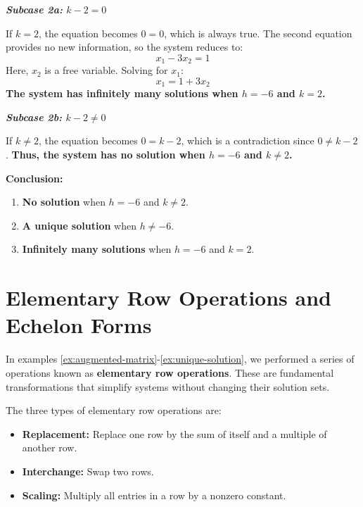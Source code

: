 \begin{example}
\begin{solution}
        \textbf{\textit{Subcase 2a:} $k - 2 = 0$}
        
          If $k = 2$, the equation becomes $0 = 0$, which is always true. The second equation provides no new information, so the system reduces to:
          \[
          x_1 - 3x_2 = 1
          \]
          Here, $x_2$ is a free variable. Solving for $x_1$:
          \[
          x_1 = 1 + 3x_2
          \]
          \textbf{The system has infinitely many solutions when $h = -6$ and $k = 2$.}
        
        \textbf{\textit{Subcase 2b:} $k - 2 \ne 0$}
        
          If $k \ne 2$, the equation becomes $0 = k - 2$, which is a contradiction since $0 \ne k - 2$. \textbf{Thus, the system has no solution when $h = -6$ and $k \ne 2$.}
                
        \textbf{Conclusion:}
        
        \begin{enumerate}[label=(\roman*)]
            \item \textbf{No solution} when $h = -6$ and $k \ne 2$.
            \item \textbf{A unique solution} when $h \ne -6$.
            \item \textbf{Infinitely many solutions} when $h = -6$ and $k = 2$.
        \end{enumerate} \end{solution}


\end{example}
\section{Elementary Row Operations and Echelon Forms}

In examples \ref{ex:augmented-matrix}-\ref{ex:unique-solution}, we performed a series of operations known as \textbf{elementary row operations}. These are fundamental transformations that simplify systems without changing their solution sets.

The three types of elementary row operations are:
\begin{itemize}
    \item \textbf{Replacement:} Replace one row by the sum of itself and a multiple of another row.
    \item \textbf{Interchange:} Swap two rows.
    \item \textbf{Scaling:} Multiply all entries in a row by a nonzero constant.
\end{itemize}

